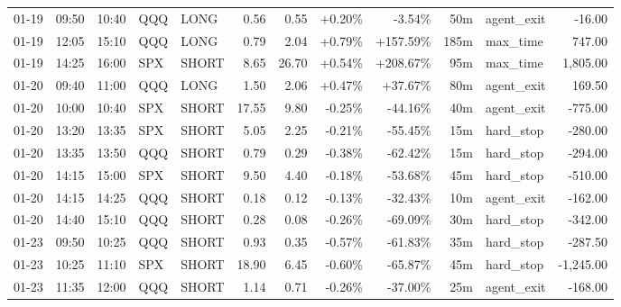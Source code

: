 \documentclass[11pt,a4paper,twoside]{article}
\begin{document}
\begin{center}
\begin{longtable}{>{\color{txtmain}}l l l l l r r r r r >{\color{txtmain}}l r}
01-19 & 09:50 & 10:40 & QQQ & LONG & 0.56 & 0.55 & \textcolor{wingreen}{+0.20\%} & \textcolor{lossred}{-3.54\%} & 50m & agent\_exit & \textcolor{lossred}{-16.00} \\
01-19 & 12:05 & 15:10 & QQQ & LONG & 0.79 & 2.04 & \textcolor{wingreen}{+0.79\%} & \textcolor{wingreen}{+157.59\%} & 185m & max\_time & \textcolor{wingreen}{747.00} \\
01-19 & 14:25 & 16:00 & SPX & SHORT & 8.65 & 26.70 & \textcolor{wingreen}{+0.54\%} & \textcolor{wingreen}{+208.67\%} & 95m & max\_time & \textcolor{wingreen}{1,805.00} \\
01-20 & 09:40 & 11:00 & QQQ & LONG & 1.50 & 2.06 & \textcolor{wingreen}{+0.47\%} & \textcolor{wingreen}{+37.67\%} & 80m & agent\_exit & \textcolor{wingreen}{169.50} \\
01-20 & 10:00 & 10:40 & SPX & SHORT & 17.55 & 9.80 & \textcolor{lossred}{-0.25\%} & \textcolor{lossred}{-44.16\%} & 40m & agent\_exit & \textcolor{lossred}{-775.00} \\
01-20 & 13:20 & 13:35 & SPX & SHORT & 5.05 & 2.25 & \textcolor{lossred}{-0.21\%} & \textcolor{lossred}{-55.45\%} & 15m & hard\_stop & \textcolor{lossred}{-280.00} \\
01-20 & 13:35 & 13:50 & QQQ & SHORT & 0.79 & 0.29 & \textcolor{lossred}{-0.38\%} & \textcolor{lossred}{-62.42\%} & 15m & hard\_stop & \textcolor{lossred}{-294.00} \\
01-20 & 14:15 & 15:00 & SPX & SHORT & 9.50 & 4.40 & \textcolor{lossred}{-0.18\%} & \textcolor{lossred}{-53.68\%} & 45m & hard\_stop & \textcolor{lossred}{-510.00} \\
01-20 & 14:15 & 14:25 & QQQ & SHORT & 0.18 & 0.12 & \textcolor{lossred}{-0.13\%} & \textcolor{lossred}{-32.43\%} & 10m & agent\_exit & \textcolor{lossred}{-162.00} \\
01-20 & 14:40 & 15:10 & QQQ & SHORT & 0.28 & 0.08 & \textcolor{lossred}{-0.26\%} & \textcolor{lossred}{-69.09\%} & 30m & hard\_stop & \textcolor{lossred}{-342.00} \\
01-23 & 09:50 & 10:25 & QQQ & SHORT & 0.93 & 0.35 & \textcolor{lossred}{-0.57\%} & \textcolor{lossred}{-61.83\%} & 35m & hard\_stop & \textcolor{lossred}{-287.50} \\
01-23 & 10:25 & 11:10 & SPX & SHORT & 18.90 & 6.45 & \textcolor{lossred}{-0.60\%} & \textcolor{lossred}{-65.87\%} & 45m & hard\_stop & \textcolor{lossred}{-1,245.00} \\
01-23 & 11:35 & 12:00 & QQQ & SHORT & 1.14 & 0.71 & \textcolor{lossred}{-0.26\%} & \textcolor{lossred}{-37.00\%} & 25m & agent\_exit & \textcolor{lossred}{-168.00} \\

\end{longtable}
\end{center}
\end{document}
